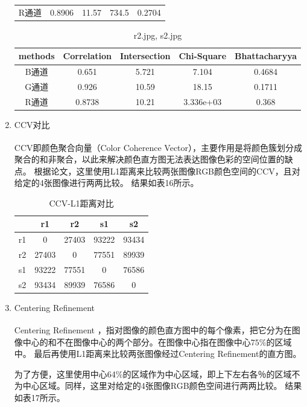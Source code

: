 \documentclass[a4paper, 12pt, UTF8]{article}
\begin{document}
\begin{enumerate}
\begin{table}[h!]
\begin{tabular}{ccccc}
        R通道 & 0.8906 & 11.57 & 734.5 & 0.2704 \\
    \end{tabular}
\end{table}
\begin{table}[h!]
    \centering
    \caption{r2.jpg, s2.jpg}
    \begin{tabular}{ccccc}
        methods & Correlation & Intersection & Chi-Square & Bhattacharyya \\ \hline
        B通道 & 0.651 & 5.721 & 7.104 & 0.4684 \\
        G通道 & 0.926 & 10.59 & 18.15 & 0.1711 \\
        R通道 & 0.8738 & 10.21 & 3.336e+03 & 0.368 \\
    \end{tabular}
\end{table}

\item CCV对比

CCV即颜色聚合向量（Color Coherence Vector）\textsuperscript{\cite{ref1}}，主要作用是将颜色簇划分成聚合的和非聚合，以此来解决颜色直方图无法表达图像色彩的空间位置的缺点。
根据论文\cite{ref2}，这里使用L1距离来比较两张图像RGB颜色空间的CCV，且对给定的4张图像进行两两比较。
结果如表16所示。

\begin{table}[h!]
    \centering
    \caption{CCV-L1距离对比}
    \begin{tabular}{ccccc}
         & r1 & r2 & s1 & s2 \\ \hline
        r1 & 0 & 27403 & 93222 & 93434 \\ \hline
        r2 & 27403 & 0 & 77551 & 89939 \\ \hline
        s1 & 93222 & 77551 & 0 & 76586 \\ \hline
        s2 & 93434 & 89939 & 76586 & 0 \\ \hline
    \end{tabular}
\end{table}

\item Centering Refinement

Centering Refinement \textsuperscript{\cite{ref2}}，指对图像的颜色直方图中的每个像素，把它分为在图像中心的和不在图像中心的两个部分。在图像中心指在图像中心$75\%$的区域中。
最后再使用L1距离来比较两张图像经过Centering Refinement的直方图。

为了方便，这里使用中心64\%的区域作为中心区域，即上下左右各％的区域不为中心区域。同样，这里对给定的4张图像RGB颜色空间进行两两比较。
结果如表17所示。


\end{enumerate}
\end{document}
